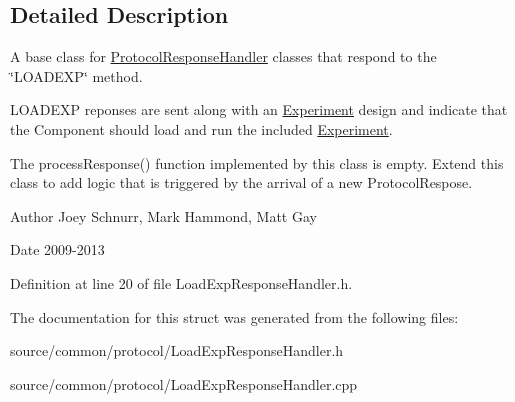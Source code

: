\subsection{Detailed Description}
A base class for \hyperlink{struct_picto_1_1_protocol_response_handler}{Protocol\-Response\-Handler} classes that respond to the \char`\"{}\-L\-O\-A\-D\-E\-X\-P\char`\"{} method. 

L\-O\-A\-D\-E\-X\-P reponses are sent along with an \hyperlink{class_picto_1_1_experiment}{Experiment} design and indicate that the Component should load and run the included \hyperlink{class_picto_1_1_experiment}{Experiment}.

The process\-Response() function implemented by this class is empty. Extend this class to add logic that is triggered by the arrival of a new Protocol\-Respose. \begin{DoxyAuthor}{Author}
Joey Schnurr, Mark Hammond, Matt Gay 
\end{DoxyAuthor}
\begin{DoxyDate}{Date}
2009-\/2013 
\end{DoxyDate}


Definition at line 20 of file Load\-Exp\-Response\-Handler.\-h.



The documentation for this struct was generated from the following files\-:\begin{DoxyCompactItemize}
\item 
source/common/protocol/Load\-Exp\-Response\-Handler.\-h\item 
source/common/protocol/Load\-Exp\-Response\-Handler.\-cpp\end{DoxyCompactItemize}
